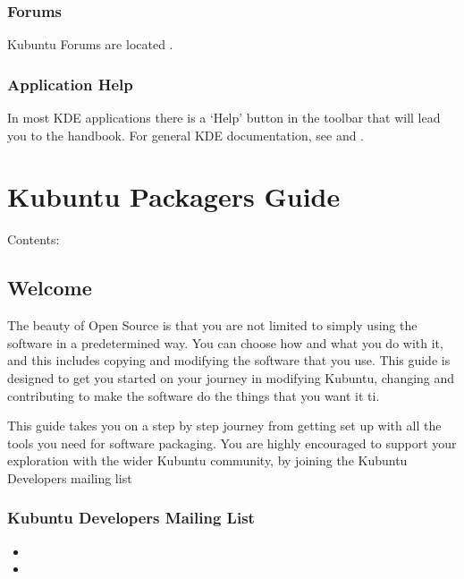 \documentclass[letterpaper,10pt,english]{sphinxmanual}
\begin{document}
\subsection{Forums}
\label{\detokenize{docs/support:forums}}
\sphinxAtStartPar
Kubuntu Forums are located .


\subsection{Application Help}
\label{\detokenize{docs/support:application-help}}
\sphinxAtStartPar
In most KDE applications there is a ‘Help’ button in the toolbar that will lead you to the handbook. For general KDE documentation, see  and .


\chapter{Kubuntu Packagers Guide}
\label{\detokenize{docs/packaging-guide/packaging:kubuntu-packagers-guide}}\label{\detokenize{docs/packaging-guide/packaging::doc}}
\sphinxAtStartPar
Contents:


\section{Welcome}
\label{\detokenize{docs/packaging-guide/welcome:welcome}}\label{\detokenize{docs/packaging-guide/welcome::doc}}
\sphinxAtStartPar
The beauty of Open Source is that you are not limited to simply using the software in a predetermined way. You can choose how and what you do with it, and this includes copying and modifying the software that you use.
This guide is designed to get you started on your journey in modifying Kubuntu, changing and contributing to make the software do the things that you want it ti.

\sphinxAtStartPar
This guide takes you on a step by step journey from getting set up with all the tools you need for software packaging. You are highly encouraged to support your exploration with the wider Kubuntu community, by joining the Kubuntu Developers mailing list


\subsection{Kubuntu Developers Mailing List}
\label{\detokenize{docs/packaging-guide/welcome:kubuntu-developers-mailing-list}}\begin{itemize}
\item {} 
\sphinxAtStartPar
{}

\item {} 
\sphinxAtStartPar
{}

\end{itemize}
\end{document}
